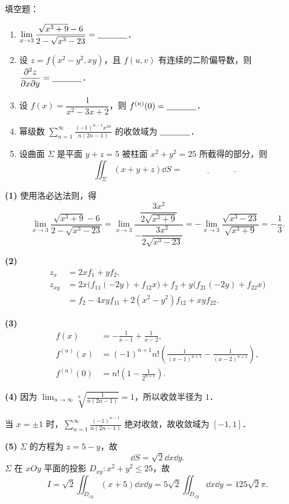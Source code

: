 
填空题：
\begin{enumerate}[label=(\arabic*)]
  \item $\displaystyle \lim_{x\to 3}\frac{\sqrt{x^3+9}-6}{2-\sqrt{x^3-23}}=\underline{\hspace{3.5em}}$．
  \item 设 $z=f(x^2-y^2,xy)$，且 $f(u,v)$ 有连续的二阶偏导数，则 $\displaystyle \frac{\partial^2 z}{\partial x\partial y}=\underline{\hspace{3.5em}}$．
  \item 设 $f(x)=\dfrac{1}{x^2-3x+2}$，则 $f^{(n)}(0)=\underline{\hspace{3.5em}}$．
  \item 幂级数 $\displaystyle \sum_{n=1}^{\infty}\frac{(-1)^{n-1}x^{2n}}{n(2n-1)}$ 的收敛域为 $\underline{\hspace{3.5em}}$．
  \item 设曲面 $\Sigma$ 是平面 $y+z=5$ 被柱面 $x^2+y^2=25$ 所截得的部分，则
  \[
    \iint_{\Sigma}(x+y+z)\dd S=\underline{\hspace{6em}}.
  \]
\end{enumerate}
\begin{solution}
\textbf{(1)} 使用洛必达法则，得
\[
\lim_{x\to3}\frac{\sqrt{x^3+9}-6}{2-\sqrt{x^3-23}}
=\lim_{x\to3}\frac{\dfrac{3x^2}{2\sqrt{x^3+9}}}{-\dfrac{3x^2}{2\sqrt{x^3-23}}}
=-\lim_{x\to3}\frac{\sqrt{x^3-23}}{\sqrt{x^3+9}}
=-\frac{1}{3}.
\]

\textbf{(2)}
\begin{align*}
z_x&=2xf_1+yf_2,\\
z_{xy}&=2x\bigl(f_{11}(-2y)+f_{12}x\bigr)+f_2+y\bigl(f_{21}(-2y)+f_{22}x\bigr)\\
&=f_2-4xyf_{11}+2(x^2-y^2)f_{12}+xyf_{22}.
\end{align*}

\textbf{(3)}
\begin{align*}
f(x)&=-\frac{1}{x-1}+\frac{1}{x-2},\\
f^{(n)}(x)&=(-1)^{n+1}n!\left(\frac{1}{(x-1)^{n+1}}-\frac{1}{(x-2)^{n+1}}\right),\\
f^{(n)}(0)&=n!\left(1-\frac{1}{2^{n+1}}\right).
\end{align*}

\textbf{(4)} 因为 $\displaystyle \lim_{n\to\infty}\sqrt[n]{\frac{1}{n(2n-1)}}=1$，所以收敛半径为 $1$．

当 $x=\pm1$ 时，$\displaystyle \sum_{n=1}^{\infty}\frac{(-1)^{n-1}}{n(2n-1)}$ 绝对收敛，故收敛域为 $[-1,1]$．

\textbf{(5)} $\Sigma$ 的方程为 $z=5-y$，故
\[
\dd S=\sqrt{2}\dd x\dd y.
\]
$\Sigma$ 在 $xOy$ 平面的投影 $D_{xy}:x^2+y^2\le25$，故
\[
I=\sqrt{2}\iint_{D_{xy}}(x+5)\dd x\dd y
=5\sqrt{2}\iint_{D_{xy}}\dd x\dd y
=125\sqrt{2}\pi.
\]
\end{solution}

